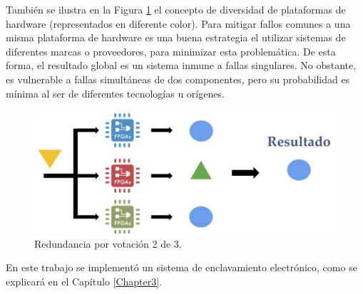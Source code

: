 			También se ilustra en la Figura \ref{fig:Redundancia} el concepto de diversidad de plataformas de hardware (representados en diferente color). Para mitigar fallos comunes a una misma plataforma de hardware es una buena estrategia el utilizar sistemas de diferentes marcas o proveedores, para minimizar esta problemática. De esta forma, el resultado global es un sistema inmune a fallas singulares. No obstante, es vulnerable a fallas simultáneas de dos componentes, pero su probabilidad es mínima al ser de diferentes tecnologías u orígenes.
			
			\begin{figure}[h]
				\centering
				\includegraphics[scale=.45]{./Figures/Redundancia}
				\caption{Redundancia por votación 2 de 3.}
				\label{fig:Redundancia}
			\end{figure}
			
			En este trabajo se implementó un sistema de enclavamiento electrónico, como se explicará en el Capítulo \ref{Chapter3}.
	 
	 		
